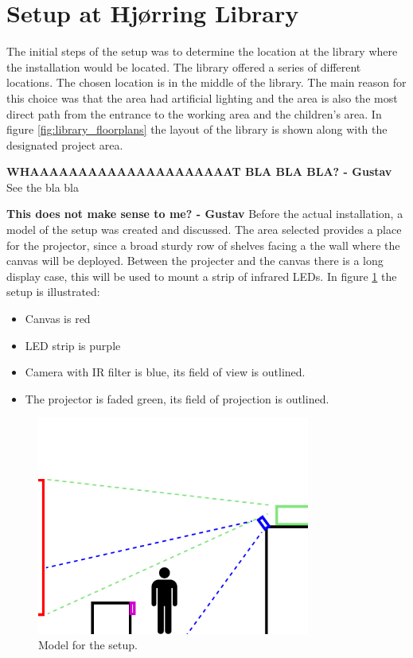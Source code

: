 \section{Setup at Hj{\o}rring Library}
The initial steps of the setup was to determine the location at the library where the installation would be located. The library offered a series of different locations. The chosen location is in the middle of the library. The main reason for this choice was that the area had artificial lighting and the area is also the most direct path from the entrance to the working area and the children's area. In figure \ref{fig:library_floorplans} the layout of the library is shown along with the designated project area.

\textbf{WHAAAAAAAAAAAAAAAAAAAAAT BLA BLA BLA? - Gustav}
See the bla bla \citep{5mm_led}


\textbf{This does not make sense to me? - Gustav}
Before the actual installation, a model of the setup was created and discussed. The area selected provides a place for the projector, since a broad sturdy row of shelves facing a the wall where the canvas will be deployed. Between the projecter and the canvas there is a long display case, this will be used to mount a strip of infrared LEDs. In figure \ref{fig:setup_model_person} the setup is illustrated:

\begin{itemize}
\item Canvas is red
\item LED strip is purple
\item Camera with IR filter is blue, its field of view is outlined.
\item The projector is faded green, its field of projection is outlined.
\end{itemize}

\begin{figure}[htbp] 
\centering 
\includegraphics[width=0.8\textwidth]{Pictures/Setup/sideview_camera_with_person.png} 
\caption{Model for the setup.} 
\label{fig:setup_model_person} 
\end{figure}

